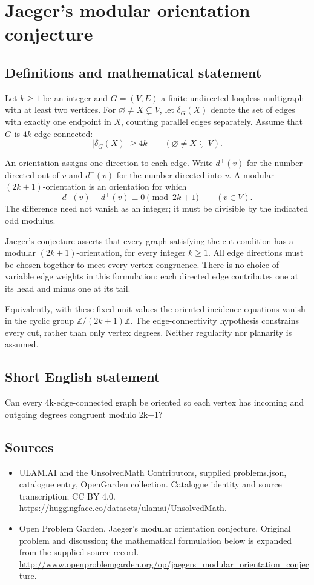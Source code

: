 \documentclass[11pt,a4paper]{article}
\begin{document}
\section*{Jaeger's modular orientation conjecture}\label{statement}

\subsection{Definitions and mathematical statement}
Let $k\geq1$ be an integer and
$G=(V,E)$ a finite undirected loopless
multigraph with at least two vertices.
For $\varnothing\neq X\subsetneq V$,
let $\delta_G(X)$ denote the set of
edges with exactly one endpoint in
$X$, counting parallel edges separately.
Assume that $G$ is $4k$-edge-connected:
\[
 |\delta_G(X)|\geq4k
 \qquad(\varnothing\neq X\subsetneq V).
\]

An orientation assigns one direction
to each edge. Write $d^+(v)$ for the
number directed out of $v$ and
$d^-(v)$ for the number directed
into $v$. A modular $(2k+1)$-orientation
is an orientation for which
\[
 d^-(v)-d^+(v)\equiv0\pmod{2k+1}
 \qquad(v\in V).
\]
The difference need not vanish as
an integer; it must be divisible
by the indicated odd modulus.

Jaeger's conjecture asserts that
every graph satisfying the cut
condition has a modular
$(2k+1)$-orientation, for every
integer $k\geq1$. All edge
directions must be chosen together
to meet every vertex congruence.
There is no choice of variable
edge weights in this formulation:
each directed edge contributes
one at its head and minus one
at its tail.

Equivalently, with these fixed
unit values the oriented incidence
equations vanish in the cyclic
group $\mathbb Z/(2k+1)\mathbb Z$.
The edge-connectivity hypothesis
constrains every cut, rather than
only vertex degrees. Neither
regularity nor planarity is assumed.
\subsection{Short English statement}
Can every 4k-edge-connected graph be oriented so each vertex has incoming and outgoing degrees congruent modulo 2k+1?
\subsection{Sources}
\begin{itemize}
\item[S1] ULAM.AI and the UnsolvedMath Contributors, supplied problems.json, catalogue entry, OpenGarden collection. Catalogue identity and source transcription; CC BY 4.0.
\url{https://huggingface.co/datasets/ulamai/UnsolvedMath}.
\item[S2] Open Problem Garden, Jaeger's modular orientation conjecture. Original problem and discussion; the mathematical formulation below is expanded from the supplied source record.
\url{http://www.openproblemgarden.org/op/jaegers_modular_orientation_conjecture}.
\end{itemize}
\end{document}

